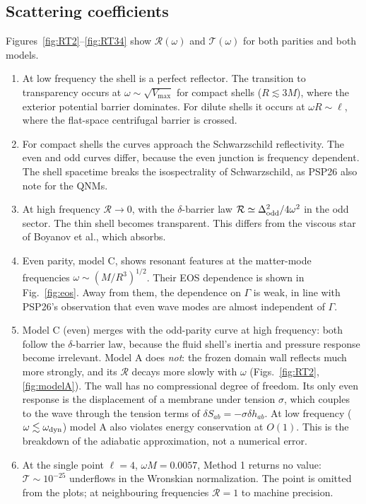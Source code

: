 \documentclass[11pt,a4paper]{article}
\numberwithin{equation}{section}
\begin{document}
\subsection{Scattering coefficients}\label{sec:res-RT}
Figures~\ref{fig:RT2}--\ref{fig:RT34} show $\mathcal R(\omega)$ and $\mathcal T(\omega)$ for both parities and
both models.
\begin{enumerate}
\item At low frequency the shell is a perfect reflector. The transition to transparency occurs at
$\omega\sim\sqrt{V_{\max}}$ for compact shells ($R\lesssim3M$), where the exterior potential barrier dominates.
For dilute shells it occurs at $\omega R\sim\ell$, where the flat-space centrifugal barrier is crossed.
\item For compact shells the curves approach the Schwarzschild reflectivity. The even and odd curves differ,
because the even junction is frequency dependent. The shell spacetime breaks the isospectrality of
Schwarzschild, as PSP26 also note for the QNMs.
\item At high frequency $\mathcal R\to0$, with the $\delta$-barrier law $\mathcal R\simeq\Delta^2_{\rm odd}/4\omega^2$ in
the odd sector. The thin shell becomes transparent. This differs from the viscous star of Boyanov et al.,
which absorbs.
\item Even parity, model C, shows resonant features at the matter-mode frequencies
$\omega\sim(M/R^3)^{1/2}$. Their EOS dependence is shown in Fig.~\ref{fig:eos}. Away from them, the
dependence on $\Gamma$ is weak, in line with PSP26's observation that even wave modes are almost independent
of $\Gamma$.
\item Model C (even) merges with the odd-parity curve at high frequency: both follow the $\delta$-barrier
law, because the fluid shell's inertia and pressure response become irrelevant. Model A does \emph{not}: the
frozen domain wall reflects much more strongly, and its $\mathcal R$ decays more slowly with $\omega$
(Figs.~\ref{fig:RT2}, \ref{fig:modelA}). The wall has no compressional degree of freedom. Its only even
response is the displacement of a membrane under tension $\sigma$, which couples to the wave through the
tension terms of $\delta S_{ab}=-\sigma\delta h_{ab}$. At low frequency ($\omega\lesssim\omega_{\rm dyn}$) model A
also violates energy conservation at $O(1)$. This is the breakdown of the adiabatic approximation, not a
numerical error.
\item At the single point $\ell=4$, $\omega M=0.0057$, Method 1 returns no value: $\mathcal T\sim10^{-25}$
underflows in the Wronskian normalization. The point is omitted from the plots; at neighbouring frequencies
$\mathcal R=1$ to machine precision.
\end{enumerate}
\end{document}
